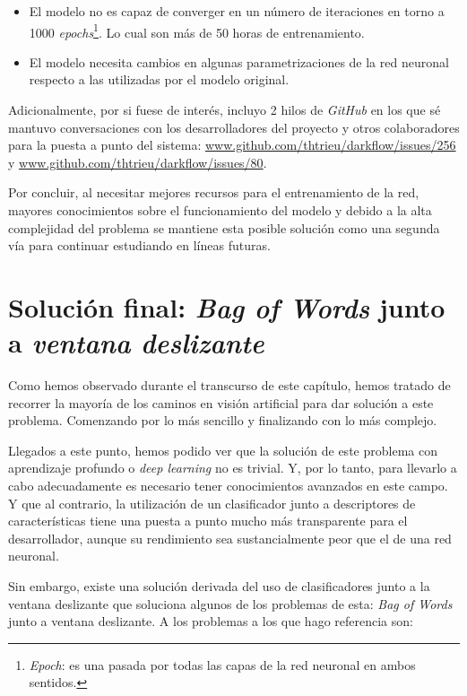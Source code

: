 \begin{itemize}
	\item El modelo no es capaz de converger en un número de iteraciones en torno a 1000 \textit{epochs}\footnote{\textit{Epoch}: es una pasada por todas las capas de la red neuronal en ambos sentidos.}. Lo cual son más de 50 horas de entrenamiento.
	\item El modelo necesita cambios en algunas parametrizaciones de la red neuronal respecto a las utilizadas por el modelo original.
\end{itemize}

Adicionalmente, por si fuese de interés, incluyo 2 hilos de \textit{GitHub} en los que sé mantuvo conversaciones con los desarrolladores del proyecto y otros colaboradores para la puesta a punto del sistema: \url{www.github.com/thtrieu/darkflow/issues/256} y \url{www.github.com/thtrieu/darkflow/issues/80}.

Por concluir, al necesitar mejores recursos para el entrenamiento de la red, mayores conocimientos sobre el funcionamiento del modelo y debido a la alta complejidad del problema se mantiene esta posible solución como una segunda vía para continuar estudiando en líneas futuras.

\section{Solución final: \textit{Bag of Words} junto  a \textit{ventana deslizante}}

Como hemos observado durante el transcurso de este capítulo, hemos tratado de recorrer la mayoría de los caminos en visión artificial para dar solución a este problema. Comenzando por lo más sencillo y finalizando con lo más complejo.

Llegados a este punto, hemos podido ver que la solución de este problema con aprendizaje profundo o \textit{deep learning} no es trivial. Y, por lo tanto, para llevarlo a cabo adecuadamente es necesario tener conocimientos avanzados en este campo. Y que al contrario, la utilización de un clasificador junto a descriptores de características tiene una puesta a punto mucho más transparente para el desarrollador, aunque su rendimiento sea sustancialmente peor que el de una red neuronal.

Sin embargo, existe una solución derivada del uso de clasificadores junto a la ventana deslizante que soluciona algunos de los problemas de esta: \textit{Bag of Words} junto a ventana deslizante. A los problemas a los que hago referencia son:

